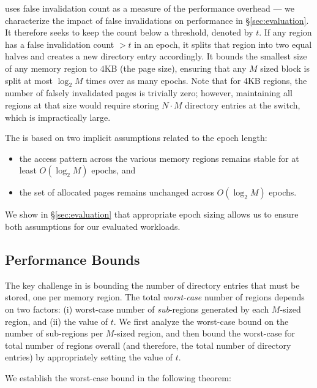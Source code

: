 \mindAlgo uses false invalidation count as a measure of the performance overhead --- we characterize the impact of false invalidations on performance in \S\ref{sec:evaluation}. It therefore seeks to keep the count below a threshold, denoted by $t$. 
If any region has a false invalidation count $> t$ in an epoch, it splits that region into two equal halves and creates a new directory entry accordingly. It bounds the smallest size of any memory region to $4$KB (the page size), ensuring that any $M$ sized block is split at most $\log_2{M}$ times over as many epochs. Note that for 4KB regions, the number of falsely invalidated pages is trivially zero; however, maintaining all regions at that size would require storing $N\cdot M$ directory entries at the switch, which is impractically large. 


 The \mindalgo is based on two implicit assumptions related to the epoch length:
\begin{itemize}[itemsep=0pt, leftmargin=*]
  \item the access pattern across the various memory regions remains stable for at least $O(\log_2{M})$ epochs, and
  \item the set of allocated pages remains unchanged across $O(\log_2{M})$ epochs.
\end{itemize}

\noindent
We show in \S\ref{sec:evaluation} that appropriate epoch sizing allows us to ensure both assumptions for our evaluated workloads.

\subsection{Performance Bounds}
\label{ssec:bound}
The key challenge in \mindalgo is bounding the number of directory entries that must be stored, one per memory region. The total \textit{worst-case} number of regions depends on two factors: (i) worst-case number of \textit{sub}-regions generated by each $M$-sized region, and (ii) the value of $t$. We first analyze the worst-case bound on the number of sub-regions per $M$-sized region, and then bound the worst-case for total number of regions overall (and therefore, the total number of directory entries) by appropriately setting the value of $t$.


 We establish the worst-case bound in the following theorem:

